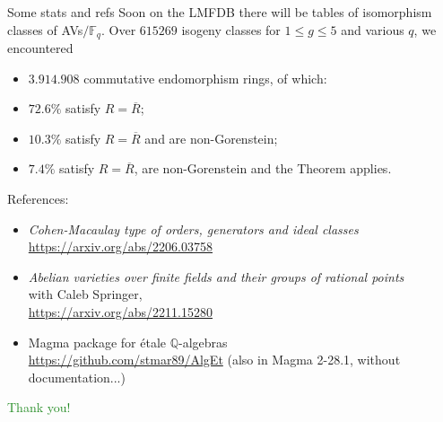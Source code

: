 \documentclass[usenames,dvipsnames,handout]{beamer}
\def\Q{\mathbb{Q}}
\def\F{\mathbb{F}}
\newcommand{\green}[1]{\textcolor{ForestGreen}{#1}}
\begin{document}
\begin{frame}{ Some stats and refs } 
    Soon on the LMFDB there will be tables of isomorphism classes of AVs$/\F_q$.
    \pause Over $615269$ isogeny classes for $1\leq g \leq 5$ and various $q$, we encountered
    \begin{itemize}
        \item $3.914.908$ commutative endomorphism rings, of which:
        \item \pause $72.6 \%$ satisfy $R=\overline{R}$;
        \item \pause $10.3 \%$ satisfy $R=\overline{R}$ and are non-Gorenstein;
        \item \pause $7.4 \%$ satisfy $R=\overline{R}$, are non-Gorenstein and the Theorem applies.
	\end{itemize}

    \pause 
    {\footnotesize References:
    \begin{itemize}
        \item \emph{Cohen-Macaulay type of orders, generators and ideal classes}\\
            \url{https://arxiv.org/abs/2206.03758}
        \item \emph{Abelian varieties over finite fields and their groups of rational points}\\
            with Caleb Springer,\\
            \url{https://arxiv.org/abs/2211.15280}
        \item Magma package for \'etale $\Q$-algebras\\
            \url{https://github.com/stmar89/AlgEt} 
            (also in Magma 2-28.1, without documentation...)
    \end{itemize}
    }
\end{frame}

\begin{frame}{  }
    \begin{center}
    \green{\huge Thank you!}
    \end{center}  
\end{frame}

	
\end{document}

